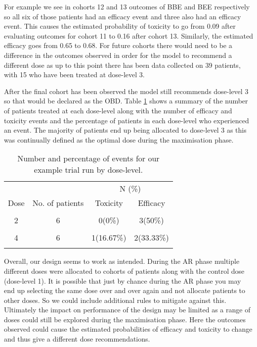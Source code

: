 For example we see in cohorts 12 and 13 outcomes of BBE and BEE respectively so all six of those patients had an efficacy event and three also had an efficacy event. This causes the estimated probability of toxicity to go from 0.09 after evaluating outcomes for cohort 11 to 0.16 after cohort 13. Similarly, the estimated efficacy goes from 0.65 to 0.68. For future cohorts there would need to be a difference in the outcomes observed in order for the model to recommend a different dose as up to this point there has been data collected on 39 patients, with 15 who have been treated at dose-level 3.

After the final cohort has been observed the model still recommends dose-level 3 so that would be declared as the OBD. Table \ref{tab_WT:SummaryExampleRunMax} shows a summary of the number of patients treated at each dose-level along with the number of efficacy and toxicity events and the percentage of patients in each dose-level who experienced an event. The majority of patients end up being allocated to dose-level 3 as this was continually defined as the optimal dose during the maximisation phase. 

\begin{table}[h!]
	\centering
	\caption{\label{tab_WT:SummaryExampleRunMax}Number and percentage of events for our example trial run by dose-level.}
	\begin{tabular}{cccc}
		\toprule
		\multicolumn{2}{c}{ } & \multicolumn{2}{c}{N (\%)} \\
		\cmidrule(l{3pt}r{3pt}){3-4}
		Dose & No. of patients & Toxicity & Efficacy\\
		\midrule
		\cellcolor{gray!6}{1} & \cellcolor{gray!6}{9} & \cellcolor{gray!6}{0 (0\%)} & \cellcolor{gray!6}{2 (22.22\%)}\\
		2 & 6 & 0(0\%) & 3(50\%)\\
		\cellcolor{gray!6}{3} & \cellcolor{gray!6}{36} & \cellcolor{gray!6}{9 (25\%)} & \cellcolor{gray!6}{26 (72.22\%)}\\
		4 & 6 & 1(16.67\%) & 2(33.33\%)\\
		\cellcolor{gray!6}{5} & \cellcolor{gray!6}{3} & \cellcolor{gray!6}{2 (66.67\%)} & \cellcolor{gray!6}{1 (33.33\%)}\\
		\bottomrule
	\end{tabular}
\end{table}

Overall, our design seems to work as intended. During the AR phase multiple different doses were allocated to cohorts of patients along with the control dose (dose-level 1). It is possible that just by chance during the AR phase you may end up selecting the same dose over and over again and not allocate patients to other doses. So we could include additional rules to mitigate against this. Ultimately the impact on performance of the design may be limited as a range of doses could still be explored during the maximisation phase. Here the outcomes observed could cause the estimated probabilities of efficacy and toxicity to change and thus give a different dose recommendations. 

